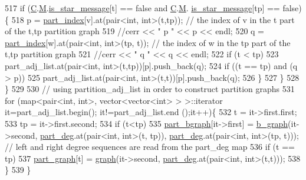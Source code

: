 \begin{DoxyCode}
517       \textcolor{keywordflow}{if} (\hyperlink{classmarked__graph__encoder_af82bc0653414091291cb75553a407bdb}{C}.\hyperlink{classcolored__graph_ab72c568fe12f7c849ca6bffb145aec47}{M}.\hyperlink{classgraph__message_a55ff5531a0043106369e84a7bc45e22d}{is\_star\_message}[t] == \textcolor{keyword}{false} and \hyperlink{classmarked__graph__encoder_af82bc0653414091291cb75553a407bdb}{C}.\hyperlink{classcolored__graph_ab72c568fe12f7c849ca6bffb145aec47}{M}.
      \hyperlink{classgraph__message_a55ff5531a0043106369e84a7bc45e22d}{is\_star\_message}[tp] == \textcolor{keyword}{false})\{
518         p = \hyperlink{classmarked__graph__encoder_a1d3e2b90f5d46244fd4cb33c69ac81f1}{part\_index}[v].at(pair<int, int>(t,tp)); \textcolor{comment}{// the index of v in the t part of the t,tp
       partition graph}
519         \textcolor{comment}{//cerr << " p " << p << endl;}
520         q = \hyperlink{classmarked__graph__encoder_a1d3e2b90f5d46244fd4cb33c69ac81f1}{part\_index}[w].at(pair<int, int>(tp, t)); \textcolor{comment}{// the index of w in the tp part of the t,tp
       partition graph}
521         \textcolor{comment}{//cerr << " q " << q << endl;}
522         \textcolor{keywordflow}{if} (t < tp)
523           part\_adj\_list.at(pair<int, int>(t,tp))[p].push\_back(q);
524         \textcolor{keywordflow}{if} ((t == tp) and (q > p))
525           part\_adj\_list.at(pair<int, int>(t,t))[p].push\_back(q);
526       \}
527     \}
528   \}
529 
530   \textcolor{comment}{// using partition\_adj\_list in order to construct partition graphs}
531   \textcolor{keywordflow}{for} (map<pair<int, int>, vector<vector<int> > >::iterator it=part\_adj\_list.begin(); it!=part\_adj\_list.end
      ();it++)\{
532     t = it->first.first;
533     tp = it->first.second;
534     \textcolor{keywordflow}{if} (t<tp)
535       \hyperlink{classmarked__graph__encoder_a5faebef707fb681c0b6c2ccf64abc04c}{part\_bgraph}[it->first] = \hyperlink{classb__graph}{b\_graph}(it->second, \hyperlink{classmarked__graph__encoder_a55ea2edb2609dfc287432f61900d6ad1}{part\_deg}.at(pair<int, int>(t,
      tp)), \hyperlink{classmarked__graph__encoder_a55ea2edb2609dfc287432f61900d6ad1}{part\_deg}.at(pair<int, int>(tp, t))); \textcolor{comment}{// left and right degree sequences are read from the
       part\_deg map}
536     \textcolor{keywordflow}{if} (t == tp)
537       \hyperlink{classmarked__graph__encoder_adbafd0769ae301acc1b2c19b5e1d4844}{part\_graph}[t] = \hyperlink{classgraph}{graph}(it->second, \hyperlink{classmarked__graph__encoder_a55ea2edb2609dfc287432f61900d6ad1}{part\_deg}.at(pair<int, int>(t,t)));
538   \}
539 \}
\end{DoxyCode}
\mbox{\label{classmarked__graph__encoder_a1cb2cd754108302a0437a924dc70bc0e}} 
